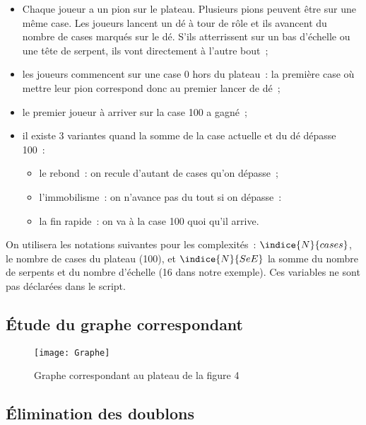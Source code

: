 \begin{itemize}
	\item Chaque joueur a un pion sur le plateau. Plusieurs pions peuvent être sur une même case. Les joueurs lancent un dé à tour de rôle et ils avancent du nombre de cases marqués sur le dé. S'ils atterrissent sur un bas d'échelle ou une tête de serpent, ils vont directement à l'autre bout~;
	\item les joueurs commencent sur une case 0 hors du plateau~: la première case où mettre leur pion correspond donc au premier lancer de dé~;
	\item le premier joueur à arriver sur la case 100 a gagné~; 
	\item il existe 3 variantes quand la somme de la case actuelle et du dé dépasse 100~:
	\begin{itemize}
		\item le rebond~: on recule d'autant de cases qu'on dépasse~;
		\item l'immobilisme~: on n'avance pas du tout si on dépasse~: 
		\item la fin rapide~: on va à la case 100 quoi qu'il arrive. 
	\end{itemize}
\end{itemize}

On utilisera les notations suivantes pour les complexités~: $\indice{N}{cases}$, le nombre de cases du plateau (100), et $\indice{N}{SeE}$ la somme du nombre de serpents et du nombre d'échelle (16 dans notre exemple). Ces variables ne sont pas déclarées dans le script.

\subsection*{Étude du graphe correspondant}

\begin{figure}[h]
	\begin{center}
		\texttt{[image: Graphe]}
	\end{center}
	\caption{Graphe correspondant au plateau de la figure 4}
	\label{fig:3}
\end{figure}


\subsection*{Élimination des doublons}



